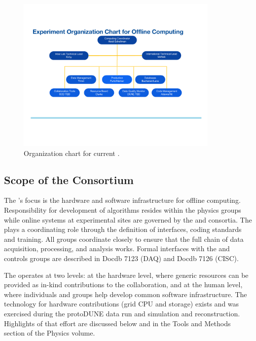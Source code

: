 

\begin{figure}[htp]
\centering
\includegraphics[height=3in]{graphics/comp_Org_Chart.pdf}
\caption{Organization chart for current . }
\label{fig:ch-exec-comp-org}
\end{figure}

\subsection{Scope of the Consortium}
The 's focus is the hardware and software infrastructure  for offline computing.  Responsibility for development of algorithms  resides within the physics groups while online systems at experimental sites are governed by the  and  consortia. The  plays a coordinating role through the definition of interfaces, coding standards and training. All groups coordinate closely to ensure that the full chain of data acquisition, processing, and analysis works. Formal interfaces with the  and controls groups are described in Docdb 7123 (DAQ)\cite{bib:docdb7123} and Docdb 7126 (CISC)\cite{bib:docdb7126}.

The  operates at two levels: at the hardware level, where generic resources can be provided as in-kind contributions to the collaboration, and at the human level, where individuals and groups help develop common software infrastructure.  The   technology for hardware contributions (grid CPU and storage) exists and was exercised during the protoDUNE data run and simulation and reconstruction. Highlights of that effort are discussed below and in the Tools and Methods section of the Physics volume.  



